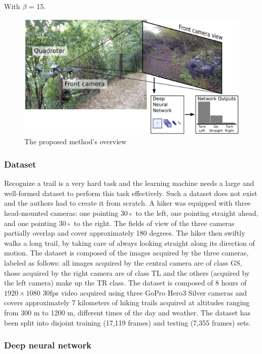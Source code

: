 With $\beta$ = 15\degree.

\begin{figure}[h!]
	\centering
	\includegraphics[width=0.8\linewidth]{images/quad.png}
	\caption{The proposed method's overview}
\end{figure}

\subsubsection{Dataset}\label{header-n47}

Recognize a trail is a very hard task and the learning machine needs a
large and well-formed dataset to perform this task effectively. Such a
dataset does not exist and the authors had to create it from scratch. A
hiker was equipped with three head-mounted cameras: one pointing 30◦ to
the left, one pointing straight ahead, and one pointing 30◦ to the
right. The fields of view of the three cameras partially overlap and
cover approximately 180 degrees. The hiker then swiftly walks a long
trail, by taking care of always looking straight along its direction of
motion. The dataset is composed of the images acquired by the three
cameras, labeled as follows: all images acquired by the central camera
are of class GS, those acquired by the right camera are of class TL and
the others (acquired by the left camera) make up the TR class. The
dataset is composed of 8 hours of $1920 \times 1080$ 30fps video acquired using
three GoPro Hero3 Silver cameras and covers approximately 7 kilometers
of hiking trails acquired at altitudes ranging from 300 m to 1200 m,
different times of the day and weather. The dataset has been split into
disjoint training (17,119 frames) and testing (7,355 frames) sets.

\subsubsection{Deep neural network}\label{header-n55}

